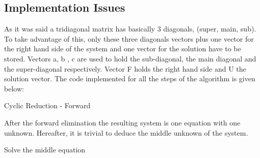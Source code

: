 \subsection{Implementation Issues}
As it was said a tridiagonal matrix has basically 3 diagonals, (super, main, sub). To take advantage of this, only these three diagonals vectors plus one vector for the right hand side of the system and one vector for the solution have to be stored.
Vectors a, b , c are used to hold the  sub-diagonal, the main diagonal and the super-diagonal respectively. Vector F holds the right hand side and U the solution vector. The code implemented for all the steps of the algorithm is given below: \\
\begin{algorithm}[H]
\begin{algorithmic}[1]
        \State{\hspace*{2cm}\}}
      \State{\}} 
\EndFunction
\end{algorithmic}
\caption{Cyclic Reduction - Forward}
\label{alg:forward_cr}
\end{algorithm}
After the forward elimination the resulting system is one equation with one unknown. Hereafter, it is trivial to deduce the middle unknown of the system. 
\begin{algorithm}[H]
\begin{algorithmic}[1]
\EndFunction
\end{algorithmic}
\caption{Solve the middle equation}
\label{alg:Find middle}
\end{algorithm}
